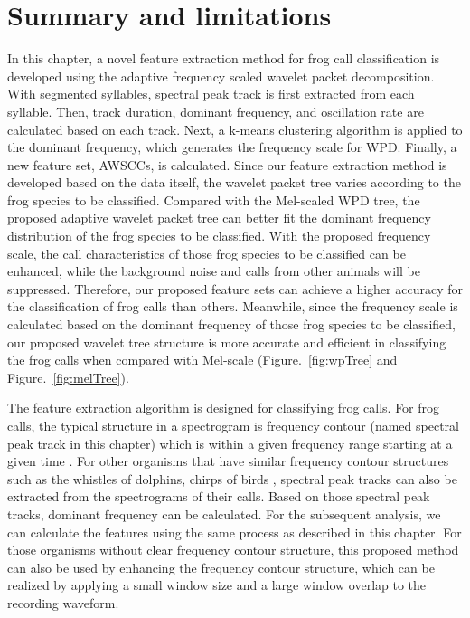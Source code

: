 \section{Summary and limitations}
In this chapter, a novel feature extraction method for frog call classification is developed using the adaptive frequency scaled wavelet packet decomposition. With segmented syllables, spectral peak track is first extracted from each syllable. Then, track duration, dominant frequency, and oscillation rate are calculated based on each track. Next, a k-means clustering algorithm is applied to the dominant frequency, which generates the frequency scale for WPD. Finally, a new feature set, AWSCCs, is calculated. Since our feature extraction method is developed based on the data itself, the wavelet packet tree varies according to the frog species to be classified. Compared with the Mel-scaled WPD tree, the proposed adaptive wavelet packet tree can better fit the dominant frequency distribution of the frog species to be classified. With the proposed frequency scale, the call characteristics of those frog species to be classified can be enhanced, while the background noise and calls from other animals will be suppressed. Therefore, our proposed feature sets can achieve a higher accuracy for the classification of frog calls than others. Meanwhile, since the frequency scale is calculated based on the dominant frequency of those frog species to be classified, our proposed wavelet tree structure is more accurate and efficient in classifying the frog calls when compared with Mel-scale (Figure.~\ref{fig:wpTree} and Figure.~\ref{fig:melTree}).


The feature extraction algorithm is designed for classifying frog calls. For frog calls, the typical structure in a spectrogram is frequency contour (named spectral peak track in this chapter) which is within a given frequency range starting at a given time \citep{mellinger2011method}. For other organisms that have similar frequency contour structures such as the whistles of dolphins, chirps of birds \citep{chen2006semi}, spectral peak tracks can also be extracted from the spectrograms of their calls. Based on those spectral peak tracks, dominant frequency can be calculated. For the subsequent analysis, we can calculate the features using the same process as described in this chapter. For those organisms without clear frequency contour structure, this proposed method can also be used by enhancing the frequency contour structure, which can be realized by applying a small window size and a large window overlap to the recording waveform. 


